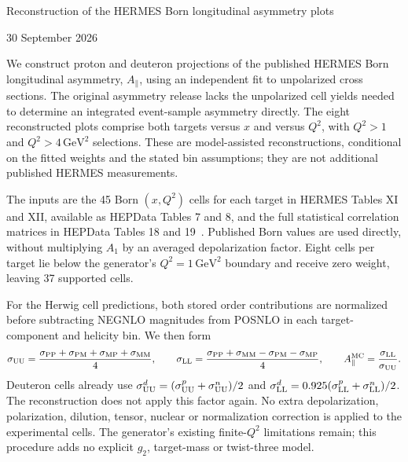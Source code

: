 \documentclass[10pt,a4paper]{article}
\newcommand{\apar}{A_{\parallel}}
\newcommand{\gev}{\mathrm{GeV}}
\begin{document}
\begin{center}
{\Large Reconstruction of the HERMES Born longitudinal asymmetry plots}\par
\small 30 September 2026
\end{center}

We construct proton and deuteron projections of the published HERMES Born
longitudinal asymmetry, $\apar$, using an independent fit to unpolarized
cross sections. The original asymmetry release lacks the unpolarized cell yields
needed to determine an integrated event-sample asymmetry directly.
The eight reconstructed plots comprise both targets versus
$x$ and versus $Q^2$, with $Q^2>1$ and $Q^2>4\,\gev^2$ selections.
These are model-assisted reconstructions, conditional on the fitted weights
and the stated bin assumptions; they are not additional published HERMES measurements.

The inputs are the 45 Born $(x,Q^2)$ cells for each target in HERMES
Tables XI and XII, available as HEPData Tables 7 and 8, and the full statistical
correlation matrices in HEPData Tables 18 and 19~\cite{spin,data}.
Published Born values are used directly, without multiplying $A_1$ by an
averaged depolarization factor. Eight cells per target lie below the generator's
$Q^2=1\,\gev^2$ boundary and receive zero weight, leaving 37 supported cells.

For the Herwig cell predictions, both stored order contributions are normalized
before subtracting NEGNLO magnitudes from POSNLO in each target-component and helicity bin.
We then form
\begin{equation}
 \sigma_{\rm UU}=\frac{\sigma_{\rm PP}+\sigma_{\rm PM}+\sigma_{\rm MP}+\sigma_{\rm MM}}{4},
 \qquad
 \sigma_{\rm LL}=\frac{\sigma_{\rm PP}+\sigma_{\rm MM}-\sigma_{\rm PM}-\sigma_{\rm MP}}{4},
 \qquad \apar^{\rm MC}=\frac{\sigma_{\rm LL}}{\sigma_{\rm UU}}.
\end{equation}
Deuteron cells already use
$\sigma_{\rm UU}^d=(\sigma_{\rm UU}^p+\sigma_{\rm UU}^n)/2$ and
$\sigma_{\rm LL}^d=0.925(\sigma_{\rm LL}^p+\sigma_{\rm LL}^n)/2$.
The reconstruction does not apply this factor again. No extra depolarization,
polarization, dilution, tensor, nuclear or normalization correction is applied
to the experimental cells. The generator's existing finite-$Q^2$ limitations remain;
this procedure adds no explicit $g_2$, target-mass or twist-three model.
\end{document}
